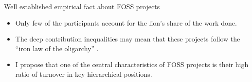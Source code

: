 \documentclass[ignorenonframetext,red,8pt,notes=hide]{beamer}
\begin{document}
\begin{frame}
\begin{block}{Well established empirical fact about FOSS projects}
\begin{itemize}
\item Only few of the participants account for the lion's share of the work done.
\item The deep contribution inequalities may mean that these projects follow the ``iron law of the oligarchy'' \citep{shaw:2014}.
\item I propose that one of the central characteristics of FOSS projects is their high ratio of turnover in key hierarchical positions.
\end{itemize}
\end{block}

\end{frame}
\end{document}
